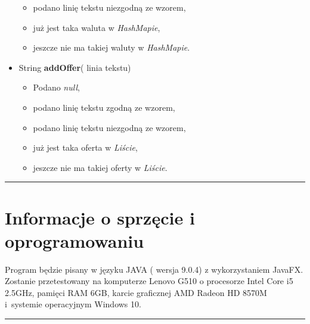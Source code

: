 \documentclass[a4paper,11pt]{article}
\newcommand{\linia}{\rule{\linewidth}{0.4mm}}
\begin{document}
\begin{itemize}
\begin{itemize}
\item podano linię tekstu niezgodną ze wzorem,
\item już jest taka waluta w \textit{HashMapie},
\item jeszcze nie ma takiej waluty w \textit{HashMapie}.
\end{itemize}
\item String \textbf{addOffer}(  linia tekstu)
\begin{itemize}
\item Podano \textit{null},
\item podano linię tekstu zgodną ze wzorem,
\item podano linię tekstu niezgodną ze wzorem,
\item już jest taka oferta w \textit{Liście},
\item jeszcze nie ma takiej oferty w \textit{Liście}.
\end{itemize}
\end{itemize}

\noindent\linia
\section{Informacje o sprzęcie i oprogramowaniu}
Program będzie pisany w języku JAVA ( wersja 9.0.4) z wykorzystaniem JavaFX. Zostanie przetestowany na komputerze Lenovo G510 o procesorze Intel Core i5 2.5GHz, pamięci RAM 6GB, karcie graficznej AMD Radeon HD 8570M i~systemie operacyjnym Windows 10.

\noindent\linia
\end{document}

